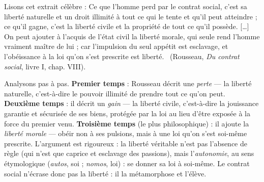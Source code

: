 \documentclass[11pt]{article}
\begin{document}
\begin{experience}
Lisons cet extrait célèbre : \guillemotleft Ce que l'homme perd par le contrat social, c'est sa liberté naturelle et un droit illimité à tout ce qui le tente et qu'il peut atteindre ; ce qu'il gagne, c'est la liberté civile et la propriété de tout ce qu'il possède. [\dots] On peut ajouter à l'acquis de l'état civil la liberté morale, qui seule rend l'homme vraiment maître de lui ; car l'impulsion du seul appétit est esclavage, et l'obéissance à la loi qu'on s'est prescrite est liberté. \guillemotright\ (Rousseau, \emph{Du contrat social}, livre I, chap. VIII).

Analysons pas à pas. \textbf{Premier temps} : Rousseau décrit une \emph{perte} — la liberté naturelle, c'est-à-dire le pouvoir illimité de prendre tout ce qu'on peut. \textbf{Deuxième temps} : il décrit un \emph{gain} — la liberté civile, c'est-à-dire la jouissance garantie et sécurisée de ses biens, protégée par la loi au lieu d'être exposée à la force du premier venu. \textbf{Troisième temps} (le plus philosophique) : il ajoute la \emph{liberté morale} — obéir non à ses pulsions, mais à une loi qu'on s'est soi-même prescrite. L'argument est rigoureux : la liberté véritable n'est pas l'absence de règle (qui n'est que caprice et esclavage des passions), mais l'\emph{autonomie}, au sens étymologique (\emph{autos}, soi ; \emph{nomos}, loi) : se donner sa loi à soi-même. Le contrat social n'écrase donc pas la liberté : il la métamorphose et l'élève.
\end{experience}
\end{document}
